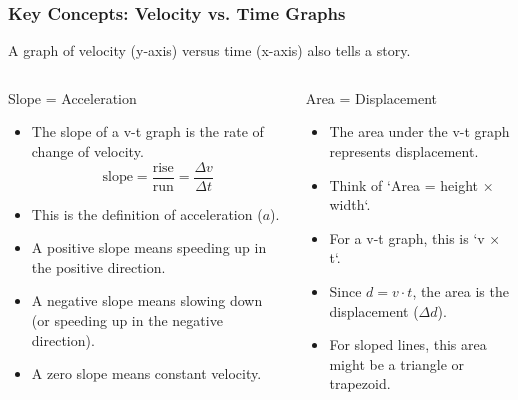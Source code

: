 \documentclass{beamer}
\begin{document}
\begin{frame}
\frametitle{Key Concepts: Velocity vs. Time Graphs}
A graph of velocity (y-axis) versus time (x-axis) also tells a story.

\begin{columns}[T]
    \begin{block}{Slope = Acceleration}
        \begin{itemize}
            \item The slope of a v-t graph is the rate of change of velocity.
            \[ \text{slope} = \frac{\text{rise}}{\text{run}} = \frac{\Delta v}{\Delta t} \]
            \item This is the definition of \alert{acceleration ($a$)}.
            \item A positive slope means speeding up in the positive direction.
            \item A negative slope means slowing down (or speeding up in the negative direction).
            \item A zero slope means \alert{constant velocity}.
        \end{itemize}
    \end{block}
    \pause
    \begin{block}{Area = Displacement}
        \begin{itemize}
            \item The area under the v-t graph represents displacement.
            \item Think of `Area = height × width`.
            \item For a v-t graph, this is `v × t`.
            \item Since $d = v \cdot t$, the \alert{area is the displacement ($\Delta d$)}.
            \item For sloped lines, this area might be a triangle or trapezoid.
        \end{itemize}
    \end{block}
\end{columns}
\end{frame}
\end{document}
